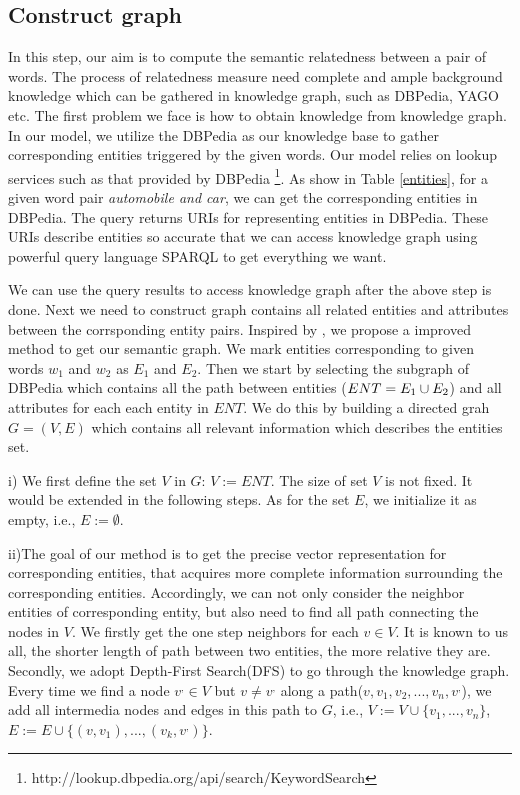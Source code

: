 \subsection{Construct graph}
In this step, our aim is to compute the semantic relatedness between a pair of words. The process of relatedness measure
need complete and ample background knowledge which can be gathered in knowledge graph, such as DBPedia, YAGO etc.
The first problem we face is how to obtain knowledge from knowledge graph. In our model, we utilize the DBPedia as
our knowledge base to gather corresponding entities triggered by the given words. Our model relies on lookup
services such as that provided by DBPedia \footnote{http://lookup.dbpedia.org/api/search/KeywordSearch}. As show 
in Table \ref{entities}, for a given word pair \emph{automobile and car}, 
we can get the corresponding entities in DBPedia. The query returns URIs for representing entities in DBPedia. 
These URIs describe entities so accurate that we can access knowledge graph using powerful query language SPARQL 
to get everything we want.

We can use the query results to access knowledge graph after the above step is done. Next we need to construct graph 
contains all related entities and attributes between the corrsponding entity pairs. Inspired by \cite{aaai/NavigliP12},
we propose a improved method to get our semantic graph. We mark entities corresponding to
given words \emph{$w_1$} and \emph{$w_2$} as \emph{$E_1$} and \emph{$E_2$}. 
Then we start by selecting the subgraph of DBPedia which contains all the path between entities
($ENT = \emph{$E_1$} \cup \emph{$E_2$}$) and all attributes for each each entity in $ENT$. We do 
this by building a directed grah ${G = (V, E)}$ which contains all relevant information which describes
the entities set.

i) We first define the set $V$ in $G$: $V:=ENT$. 
The size of set $V$ is not fixed. It would be extended in the following steps.
As for the set $E$, we initialize it as empty, i.e., $E:=\emptyset$.

ii)The goal of our method is to get the precise vector representation for corresponding entities,
that acquires more complete information surrounding the corresponding entities.
Accordingly, we can not only consider the neighbor entities of corresponding entity, but also
need to find all path connecting the nodes in $V$. 
We firstly get the one step neighbors for each $v \in V$. It is known to us all, the shorter
length of path between two entities, the more relative they are.
Secondly, we adopt Depth-First Search(DFS) to go through the knowledge graph. Every time we find a node
$v^, \in V$ but $v \ne v^,$ along a path($v, v_1, v_2,...,v_n, v^,$), we add all intermedia 
nodes and edges in this path to $G$, i.e., $V:=V \cup \{v_1, ..., v_n\}$, 
$E:=E \cup \{(v, v_1), ..., (v_k, v^ ,)\}$.

